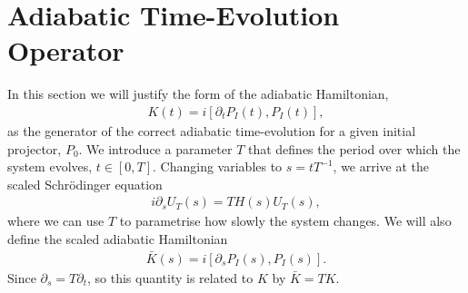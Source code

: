 \section{Adiabatic Time-Evolution Operator}\label{sec:kato_appendix}

In this section we will justify the form of the adiabatic Hamiltonian,
\begin{align}
    K(t) = i\left[ \partial_t P_I(t), P_I(t) \right],
\end{align}
as the generator of the correct adiabatic time-evolution for a given initial projector, $P_0$. We introduce a parameter $T$ that defines the period over which the system evolves, $t \in [0,T]$. Changing variables to $s = tT^{-1}$, we arrive at the scaled Schr\"odinger equation
\begin{align}\label{eqn:scaled_schrodinger}
    i \partial_s U_T(s) = TH(s) U_T(s),
\end{align}
where we can use $T$ to parametrise how slowly the system changes. We will also define the scaled adiabatic Hamiltonian
\begin{align}
    \bar K(s) = i[\partial_s P_I(s), P_I(s)].
\end{align}
Since $\partial_s = T \partial_t$, so this quantity is related to $K$ by $\bar K = T K$.

